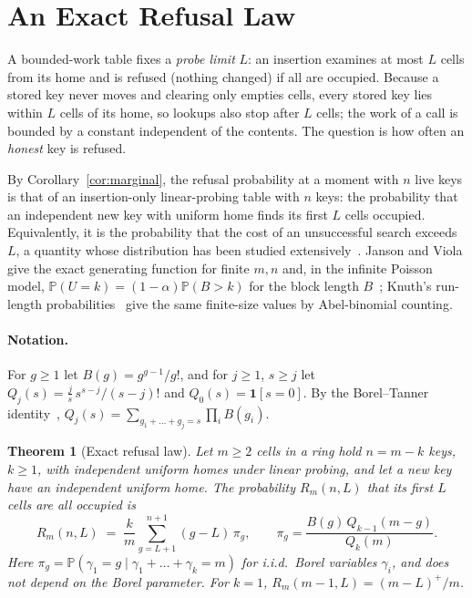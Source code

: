 \documentclass[11pt,a4paper]{article}
\newtheorem{theorem}{Theorem}
\theoremstyle{definition}
\theoremstyle{remark}
\newcommand{\Prob}{\mathbb{P}}
\begin{document}
\section{An Exact Refusal Law}\label{sec:law}

A bounded-work table fixes a \emph{probe limit} $L$: an insertion examines at most $L$ cells from its home and is refused (nothing changed) if all are occupied. Because a stored key never moves and clearing only empties cells, every stored key lies within $L$ cells of its home, so lookups also stop after $L$ cells; the work of a call is bounded by a constant independent of the contents. The question is how often an \emph{honest} key is refused.

By Corollary~\ref{cor:marginal}, the refusal probability at a moment with $n$ live keys is that of an insertion-only linear-probing table with $n$ keys: the probability that an independent new key with uniform home finds its first $L$ cells occupied. Equivalently, it is the probability that the cost of an unsuccessful search exceeds $L$, a quantity whose distribution has been studied extensively~\cite{knuth3,fpv1998,janson2001}. Janson and Viola give the exact generating function for finite $m,n$ and, in the infinite Poisson model, $\Prob(U=k)=(1-\alpha)\Prob(B>k)$ for the block length $B$~\cite[Thm.~11.1, Eq.~(11.4)]{janson2016}; Knuth's run-length probabilities~\cite{knuth3} give the same finite-size values by Abel-binomial counting.

\paragraph{Notation.} For $g\ge1$ let $B(g)=g^{g-1}/g!$, and for $j\ge1$, $s\ge j$ let $Q_j(s)=\tfrac{j}{s}\,s^{s-j}/(s-j)!$ and $Q_0(s)=\mathbf 1[s=0]$. By the Borel--Tanner identity~\cite{tanner1961}, $Q_j(s)=\sum_{g_1+\dots+g_j=s}\prod_i B(g_i)$.

\begin{theorem}[Exact refusal law]\label{thm:law}
Let $m\ge2$ cells in a ring hold $n=m-k$ keys, $k\ge1$, with independent uniform homes under linear probing, and let a new key have an independent uniform home. The probability $R_m(n,L)$ that its first $L$ cells are all occupied is
\begin{equation}\label{eq:law}
R_m(n,L)\;=\;\frac{k}{m}\sum_{g=L+1}^{n+1}(g-L)\,\pi_g,\qquad
\pi_g=\frac{B(g)\,Q_{k-1}(m-g)}{Q_k(m)} .
\end{equation}
Here $\pi_g=\Prob(\gamma_1=g\mid\gamma_1+\dots+\gamma_k=m)$ for i.i.d.\ Borel variables $\gamma_i$, and does not depend on the Borel parameter. For $k=1$, $R_m(m-1,L)=(m-L)^+/m$.
\end{theorem}
\end{document}
